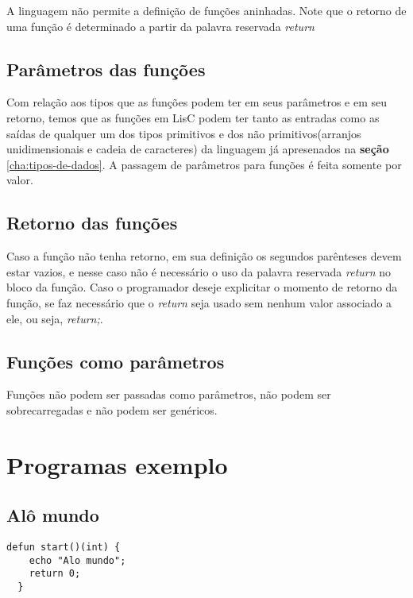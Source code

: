 \documentclass[
  12pt,				%
  oneside,			%
  a4paper,			%
  english,			%
  french,				%
  spanish,			%
  brazil,				%
]{abntex2}
\begin{document}
A linguagem não permite a definição de funções aninhadas. Note que o
retorno de uma função é determinado a partir da palavra reservada
\emph{return}

\section{Parâmetros das funções}
\label{sec:parametros-das-funções}

Com relação aos tipos que as funções podem ter em seus
parâmetros e em seu retorno, temos que as funções em LisC podem ter
tanto as entradas como as saídas de qualquer um dos tipos primitivos e
dos não primitivos(arranjos unidimensionais e cadeia de caracteres) da
linguagem já apresenados na \textbf{seção} \ref{cha:tipos-de-dados}. A
passagem de parâmetros para funções é feita somente por valor.

\section{Retorno das funções}
\label{sec:returno-das-funcoes}

Caso a função não tenha retorno, em sua definição os segundos parênteses
devem estar vazios, e nesse caso não é necessário o uso da palavra
reservada \emph{return} no bloco da função. Caso o programador deseje
explicitar o momento de retorno da função, se faz necessário que o
\emph{return} seja usado sem nenhum valor associado a ele, ou
seja, \emph{return;}.

\section{Funções como parâmetros}
\label{sec:funções-como-parametros}

Funções não podem ser passadas como parâmetros, não podem ser
sobrecarregadas e não podem ser genéricos.

\chapter{Programas exemplo}
\label{cha:programas-exemplo}

\section{Alô mundo}
\label{sec:alo-mundo}

\begin{lstlisting}[label=code:alo-mundo,caption=Programa Alô mundo]
  defun start()(int) {
    echo "Alo mundo";
    return 0;
  }
\end{lstlisting}
\end{document}
